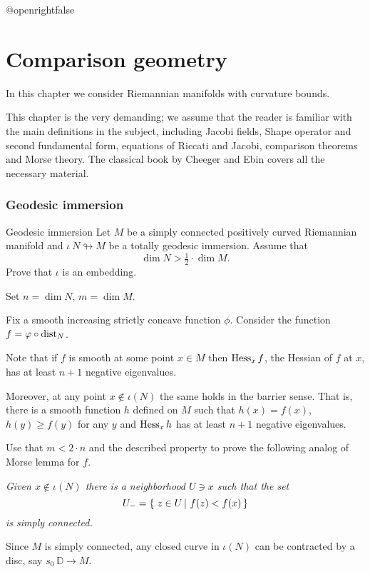 \csname @openrightfalse\endcsname
\chapter{Comparison geometry}

In this chapter we consider Riemannian manifolds with curvature bounds.

This chapter is the very demanding;
we assume that the reader is familiar with the 
main definitions in the subject,
including Jacobi fields, 
Shape operator and second fundamental form, 
equations of Riccati and Jacobi,
comparison theorems and Morse theory.
The classical book \cite{cheeger-ebin} by Cheeger and Ebin covers all the  necessary  material.

\subsection*{Geodesic immersion\hard}

\begin{pr}{\hard}{Geodesic immersion}
\label{Geodesic immersion}
Let $M$ be a simply connected positively curved Riemannian manifold and $\iota\:N\looparrowright M$ be a totally geodesic immersion.
Assume that 
\[\dim N>\tfrac 12\cdot \dim M.\]
Prove that $\iota$ is an embedding.
\end{pr}

Set $n=\dim N$, $m=\dim M$.

Fix a smooth increasing strictly concave function $\phi$.
Consider the function $f=\varphi\circ\operatorname{\rm dist}_N$.

Note that if $f$ is smooth at some point $x\in M$ 
then $\operatorname{\rm Hess}\nolimits_xf$, the Hessian of $f$ at $x$, 
has at least $n+1$ negative eigenvalues.

Moreover, at any point $x\notin \iota(N)$ the same holds in the barrier sense.
That is, there is a smooth function $h$ defined on $M$
such that $h(x)=f(x)$, $h(y)\ge f(y)$ for any $y$
and $\operatorname{\rm Hess}\nolimits_xh$ has at least $n+1$ negative eigenvalues.

Use that $m< 2\cdot n$ and the described property to prove the following
analog of Morse lemma for $f$.

{\it Given $x\notin \iota(N)$ there is a neighborhood $U\ni x$ such that the set 
\[U_-=\set{z\in U}{f(z)<f(x)}\] is simply connected.}

\medskip

Since $M$ is simply connected,
any closed curve in $\iota(N)$
can be contracted by a disc, say $s_0\:\mathbb D\to M$.

